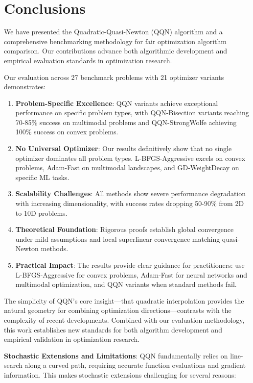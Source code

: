 \hypertarget{conclusions}{%
\section{Conclusions}\label{conclusions}}

We have presented the Quadratic-Quasi-Newton (QQN) algorithm and a comprehensive benchmarking methodology for fair optimization algorithm comparison. Our contributions advance both algorithmic development and empirical evaluation standards in optimization research.

Our evaluation across 27 benchmark problems with 21 optimizer variants demonstrates:

\begin{enumerate}
\def\labelenumi{\arabic{enumi}.}
\item
  \textbf{Problem-Specific Excellence}: QQN variants achieve exceptional performance on specific problem types, with QQN-Bisection variants reaching 70-85\% success on multimodal problems and QQN-StrongWolfe achieving 100\% success on convex problems.
\item
  \textbf{No Universal Optimizer}: Our results definitively show that no single optimizer dominates all problem types. L-BFGS-Aggressive excels on convex problems, Adam-Fast on multimodal landscapes, and GD-WeightDecay on specific ML tasks.
\item
  \textbf{Scalability Challenges}: All methods show severe performance degradation with increasing dimensionality, with success rates dropping 50-90\% from 2D to 10D problems.
\item
  \textbf{Theoretical Foundation}: Rigorous proofs establish global convergence under mild assumptions and local superlinear convergence matching quasi-Newton methods.
\item
  \textbf{Practical Impact}: The results provide clear guidance for practitioners: use L-BFGS-Aggressive for convex problems, Adam-Fast for neural networks and multimodal optimization, and QQN variants when standard methods fail.
\end{enumerate}

The simplicity of QQN's core insight---that quadratic interpolation provides the natural geometry for combining optimization directions---contrasts with the complexity of recent developments.
Combined with our evaluation methodology, this work establishes new standards for both algorithm development and empirical validation in optimization research.

\textbf{Stochastic Extensions and Limitations}: QQN fundamentally relies on line-search along a curved path, requiring accurate function evaluations and gradient information. This makes stochastic extensions challenging for several reasons:

